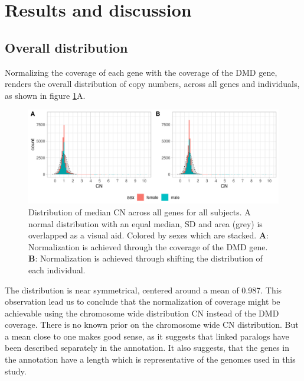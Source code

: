 
\section*{Results and discussion} %


\subsection*{Overall distribution}
Normalizing the coverage of each gene with the coverage of the DMD gene, renders the overall distribution of copy numbers, across all genes and individuals, as shown in figure \ref{fig:qc_dist_all}A. 

\begin{figure}[h] 
  \centering
  \includegraphics[scale=0.78]{figures/fig_overall_1and3.pdf}
  
  \caption{Distribution of median CN across all genes for all subjects. A normal distribution with an equal median, SD and area (grey) is overlapped as a visual aid. Colored by sexes which are stacked. \textbf{A}: Normalization is achieved through the coverage of the DMD gene. \textbf{B}: Normalization is achieved through shifting the distribution of each individual.}
  
  \label{fig:qc_dist_all}
\end{figure}

\noindent The distribution is near symmetrical, centered around a mean of 0.987. This observation lead us to conclude that the normalization of coverage might be achievable using the chromosome wide distribution CN instead of the DMD coverage. There is no known prior on the chromosome wide CN distribution. But a mean close to one makes good sense, as it suggests that linked paralogs have been described separately in the annotation. It also suggests, that the genes in the annotation have a length which is representative of the genomes used in this study.


